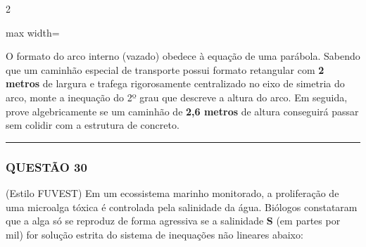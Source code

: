 \documentclass[11pt, a4paper]{article}
\begin{document}
\begin{multicols*}{2}
\begin{center}
\begin{adjustbox}{max width=\linewidth}
\end{adjustbox}
\end{center}

O formato do arco interno (vazado) obedece à equação de uma parábola. Sabendo que um caminhão especial de transporte possui formato retangular com \textbf{2 metros} de largura e trafega rigorosamente centralizado no eixo de simetria do arco, monte a inequação do 2º grau que descreve a altura do arco. Em seguida, prove algebricamente se um caminhão de \textbf{2,6 metros} de altura conseguirá passar sem colidir com a estrutura de concreto.

\vspace{0cm} \noindent\textcolor{CorLinha}{\rule{\linewidth}{0.5pt}} \vspace{-0.2cm}
\subsubsection*{QUESTÃO 30}
(Estilo FUVEST) Em um ecossistema marinho monitorado, a proliferação de uma microalga tóxica é controlada pela salinidade da água. Biólogos constataram que a alga só se reproduz de forma agressiva se a salinidade \textbf{S} (em partes por mil) for solução estrita do sistema de inequações não lineares abaixo:


\end{multicols*}
\end{document}

